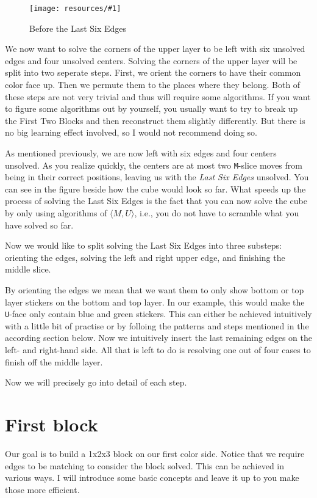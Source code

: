 \documentclass[a4paper]{scrreprt}
\newcommand{\wrapfig}[5] {
	\begin{figure}
	\centering
	\texttt{[image: resources/\#1]}
	\caption*{#5}
	\end{figure}
}
\begin{document}
\wrapfig{lse.png}{L}{0.3}{0.3}{Before the Last Six Edges}

We now want to solve the corners of the upper layer to be left with six unsolved edges and four unsolved centers. Solving the corners of the upper layer will be split into two seperate steps. First, we orient the corners to have their common color face up. Then we permute them to the places where they belong. Both of these steps are not very trivial and thus will require some algorithms. If you want to figure some algorithms out by yourself, you usually want to try to break up the First Two Blocks and then reconstruct them slightly differently. But there is no big learning effect involved, so I would not recommend doing so.\par

As mentioned previously, we are now left with six edges and four centers unsolved. As you realize quickly, the centers are at most two \texttt{M}-slice moves from being in their correct positions, leaving us with the \emph{Last Six Edges} unsolved. You can see in the figure beside how the cube would look so far. What speeds up the process of solving the Last Six Edges is the fact that you can now solve the cube by only using algorithms of $\langle M, U\rangle$, i.e., you do not have to scramble what you have solved so far.\par

Now we would like to split solving the Last Six Edges into three substeps: orienting the edges, solving the left and right upper edge, and finishing the middle slice.\par

By orienting the edges we mean that we want them to only show bottom or top layer stickers on the bottom and top layer. In our example, this would make the \texttt{U}-face only contain blue and green stickers. This can either be achieved intuitively with a little bit of practise or by folloing the patterns and steps mentioned in the according section below. Now we intuitively insert the last remaining edges on the left- and right-hand side. All that is left to do is resolving one out of four cases to finish off the middle layer.\par

Now we will precisely go into detail of each step.

\section{First block}
Our goal is to build a 1x2x3 block on our first color side. Notice that we require edges to be matching to consider the block solved. This can be achieved in various ways. I will introduce some basic concepts and leave it up to you make those more efficient.\par
\end{document}

